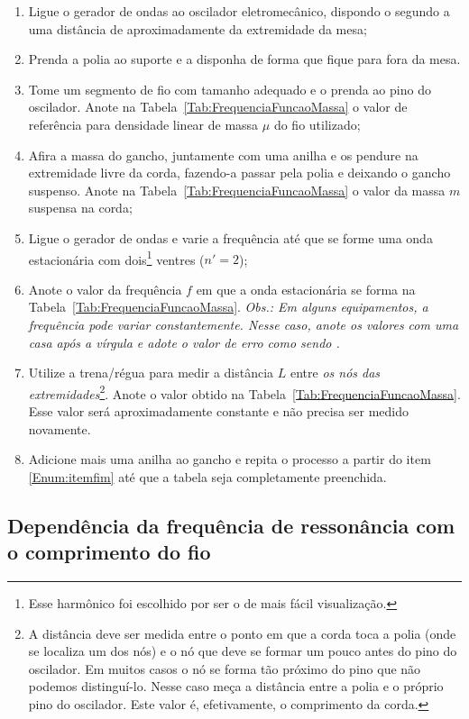 \begin{enumerate}
\item Ligue o gerador de ondas ao oscilador eletromecânico, dispondo o segundo a uma distância de aproximadamente  da extremidade da mesa;\label{Enum:iteminicio}
\item Prenda a polia ao suporte e a disponha de forma que fique para fora da mesa.
\item Tome um segmento de fio com tamanho adequado e o prenda ao pino do oscilador. Anote na Tabela~\ref{Tab:FrequenciaFuncaoMassa} o valor de referência para densidade linear de massa $\mu$ do fio utilizado;
\item Afira a massa do gancho, juntamente com uma anilha e os pendure na extremidade livre da corda, fazendo-a passar pela polia e deixando o gancho suspenso. Anote na Tabela~\ref{Tab:FrequenciaFuncaoMassa} o valor da massa $m$ suspensa na corda;\label{Enum:itemfim}
\item Ligue o gerador de ondas e varie a frequência até que se forme uma onda estacionária com dois\footnote{Esse harmônico foi escolhido por ser o de mais fácil visualização.} ventres ($n' =2$);
\item Anote o valor da frequência $f$ em que a onda estacionária se forma na Tabela~\ref{Tab:FrequenciaFuncaoMassa}. \emph{Obs.: Em alguns equipamentos, a frequência pode variar constantemente. Nesse caso, anote os valores com uma casa após a vírgula e adote o valor de erro como sendo .}
\item Utilize a trena/régua para medir a distância $L$ entre \emph{os nós das extremidades}\footnote{A distância deve ser medida entre o ponto em que a corda toca a polia (onde se localiza um dos nós) e o nó que deve se formar um pouco antes do pino do oscilador. Em muitos casos o nó se forma tão próximo do pino que não podemos distinguí-lo. Nesse caso meça a distância entre a polia e o próprio pino do oscilador. Este valor é, efetivamente, o comprimento da corda.}. Anote o valor obtido na Tabela~\ref{Tab:FrequenciaFuncaoMassa}. Esse valor será aproximadamente constante e não precisa ser medido novamente.
\item Adicione mais uma anilha ao gancho e repita o processo a partir do item \ref{Enum:itemfim} até que a tabela seja completamente preenchida.
\end{enumerate}

\subsection{Dependência da frequência de ressonância com o comprimento do fio}

